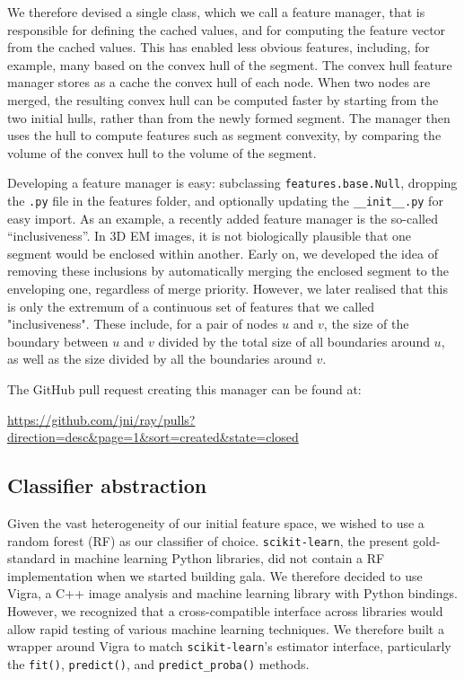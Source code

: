 \documentclass{frontiersSCNS} %
\begin{document}
We therefore devised a single class, which we call a feature manager, that is responsible for defining the cached values, and for computing the feature vector from the cached values.
This has enabled less obvious features, including, for example, many based on the convex hull of the segment.
The convex hull feature manager stores as a cache the convex hull of each node.
When two nodes are merged, the resulting convex hull can be computed faster by starting from the two initial hulls, rather than from the newly formed segment.
The manager then uses the hull to compute features such as segment convexity, by comparing the volume of the convex hull to the volume of the segment.

Developing a feature manager is easy: subclassing \texttt{\small features.base.Null}, dropping the \texttt{.py} file in the features folder, and optionally updating the \texttt{\small \_\_init\_\_.py} for easy import.
As an example, a recently added feature manager is the so-called ``inclusiveness''.
In 3D EM images, it is not biologically plausible that one segment would be enclosed within another.
Early on, we developed the idea of removing these inclusions by automatically merging the enclosed segment to the enveloping one, regardless of merge priority.
However, we later realised that this is only the extremum of a continuous set of features that we called "inclusiveness".
These include, for a pair of nodes $u$ and $v$, the size of the boundary between $u$ and $v$ divided by the total size of all boundaries around $u$, as well as the size divided by all the boundaries around $v$.

The GitHub pull request creating this manager can be found at:

\url{https://github.com/jni/ray/pulls?direction=desc&page=1&sort=created&state=closed}

\subsection{Classifier abstraction}

Given the vast heterogeneity of our initial feature space, we wished to use a random forest (RF) as our classifier of choice.
\texttt{\small scikit-learn}, the present gold-standard in machine learning Python libraries, did not contain a RF implementation when we started building gala.
We therefore decided to use Vigra, a C++ image analysis and machine learning library with Python bindings.
However, we recognized that a cross-compatible interface across libraries would allow rapid testing of various machine learning techniques.
We therefore built a wrapper around Vigra to match \texttt{\small scikit-learn}'s estimator interface, particularly the \texttt{\small fit()}, \texttt{\small predict()}, and \texttt{\small predict\_proba()} methods.
\end{document}
